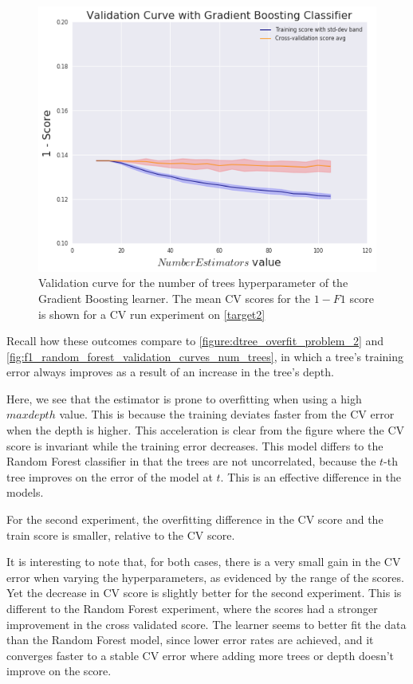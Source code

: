 \begin{figure}[h!]
	\begin{center}
		\includegraphics[width=1\linewidth]{figures/gradient-boosting/validation_curve_boosting_num_trees_series_f1} 
			\caption{ Validation curve for the number of trees hyperparameter of the Gradient Boosting learner. The mean CV scores for the $1 - F1$ score is shown for a CV run experiment on \cref{target2}}
			\label{fig:f1_boosting_validation_curves_num_trees}
	\end{center}
\end{figure}


Recall how these outcomes compare to \cref{figure:dtree_overfit_problem_2} and \cref{fig:f1_random_forest_validation_curves_num_trees},
in which a tree's training error always improves as a result of an increase in the tree's depth.

Here, we see that the estimator is prone to overfitting when using a high $max depth$ value.
This is because the training deviates faster from the CV error when the depth is higher.
This acceleration is clear from the figure where the CV score is invariant while the training error decreases.
This model differs to the Random Forest classifier in that the trees are not uncorrelated, because the $t$-th tree improves on the error of the model at $t$.
This is an effective difference in the models.

For the second experiment, the overfitting difference in the CV score and the train score is smaller, relative to the CV score.

It is interesting to note that, for both cases, there is a very small gain in the CV error when varying the hyperparameters, as evidenced by the range of the scores.
Yet the decrease in CV score is slightly better for the second experiment.
This is different to the Random Forest experiment, where the scores had a stronger improvement in the cross validated score.
The learner seems to better fit the data than the Random Forest model, since lower error rates are achieved, and it converges faster to a stable CV error where adding more trees or depth doesn't improve on the score.

